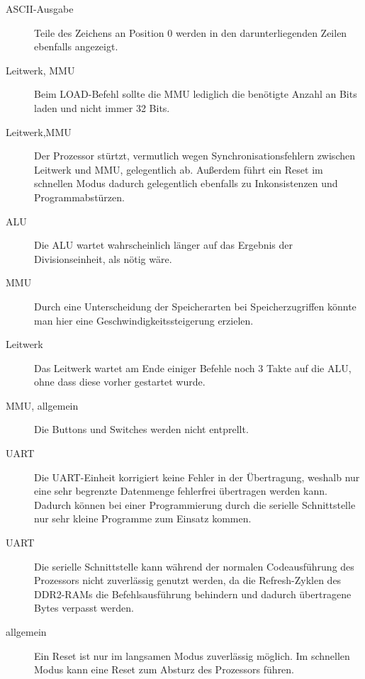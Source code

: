 \begin{description}
\item[ASCII-Ausgabe] Teile des Zeichens an Position 0 werden in den
darunterliegenden Zeilen ebenfalls angezeigt.
\item[Leitwerk, MMU] Beim LOAD-Befehl sollte die MMU lediglich die ben\"otigte
Anzahl an Bits laden und nicht immer 32 Bits.
\item[Leitwerk,MMU] Der Prozessor st\"urtzt, vermutlich wegen
Synchronisationsfehlern zwischen Leitwerk und MMU, gelegentlich ab. Au\ss{}erdem f\"uhrt ein Reset im schnellen Modus dadurch gelegentlich ebenfalls zu Inkonsistenzen und Programmabst\"urzen.
\item[ALU] Die ALU wartet wahrscheinlich l\"anger auf das Ergebnis der
Divisionseinheit, als n\"otig w\"are.
\item[MMU] Durch eine Unterscheidung der Speicherarten bei Speicherzugriffen
k\"onnte man hier eine Geschwindigkeitssteigerung erzielen.
\item[Leitwerk] Das Leitwerk wartet am Ende einiger Befehle noch 3 Takte auf
die ALU, ohne dass diese vorher gestartet wurde.
\item[MMU, allgemein] Die Buttons und Switches werden nicht entprellt.
\item[UART] Die UART-Einheit korrigiert keine Fehler in der \"Ubertragung,
weshalb nur eine sehr begrenzte Datenmenge fehlerfrei \"ubertragen werden kann.
Dadurch k\"onnen bei einer Programmierung durch die serielle Schnittstelle nur
sehr kleine Programme zum Einsatz kommen.
\item[UART] Die serielle Schnittstelle kann w\"ahrend der normalen
Codeausf\"uhrung des Prozessors nicht zuverl\"assig genutzt werden, da die
Refresh-Zyklen des DDR2-RAMs die Befehlsausf\"uhrung behindern und dadurch
\"ubertragene Bytes verpasst werden.
\item[allgemein] Ein Reset ist nur im langsamen Modus zuverl\"assig m\"oglich. Im
schnellen Modus kann eine Reset zum Absturz des Prozessors f\"uhren.
\end{description}

